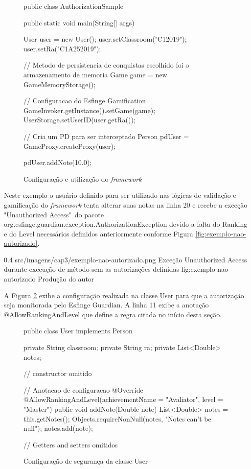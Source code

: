\begin{figure}[H]
    \centering
    \caption{Configuração e utilização do \textit{framework}}
    \begin{java}
public class AuthorizationSample {

	public static void main(String[] args) {

		User user = new User();
		user.setClassroom("C12019");
		user.setRa("C1A252019");
		
		// Metodo de persistencia de conquistas escolhido foi o armazenamento de memoria
		Game game = new GameMemoryStorage();

		// Configuracao do Esfinge Gamification
		GameInvoker.getInstance().setGame(game);
		UserStorage.setUserID(user.getRa());

		// Cria um PD para ser interceptado
		Person pdUser = GameProxy.createProxy(user);

		pdUser.addNote(10.0);

	}
}
    \end{java}
    \label{fig:hellow-world-gamification}
\end{figure}

\par Neste exemplo o usuário definido para ser utilizado nas lógicas de validação e gamificação do \textit{framework} tenta alterar suas notas na linha 20 e recebe a exceção "Unauthorized Access"\ do pacote org.esfinge.guardian.exception.AuthorizationException devido a falta do Ranking e do Level necessários definidos anteriormente conforme Figura \ref{fig:exemplo-nao-autorizado}.

\begin{image}
{0.4}
{src/imagens/cap3/exemplo-nao-autorizado.png}
{Exceção Unauthorized Access durante execução de método sem as autorizações definidas}
{fig:exemplo-nao-autorizado}
{Produção do autor}
\end{image}

\par A Figura \ref{fig:execao-configuracao} exibe a configuração realizada na classe User para que a autorização seja monitorada pelo Esfinge Guardian. A linha 11 exibe a anotação @AllowRankingAndLevel que define a regra citada no início desta seção.

\begin{figure}[H]
    \centering
    \caption{Configuração de segurança da classe User}
    \begin{java}
public class User implements Person {

	private String classroom;
	private String ra;
	private List<Double> notes;

// constructor omitido
    
// Anotacao de configuracao
        @Override
	@AllowRankingAndLevel(achievementName = "Avaliator", level = "Master")
	public void addNote(Double note) {
		List<Double> notes = this.getNotes();
		Objects.requireNonNull(notes, "Notes can't be null");
		notes.add(note);
	}
	
// Getters and setters omitidos
}
    \end{java}
    \label{fig:execao-configuracao}
\end{figure}

